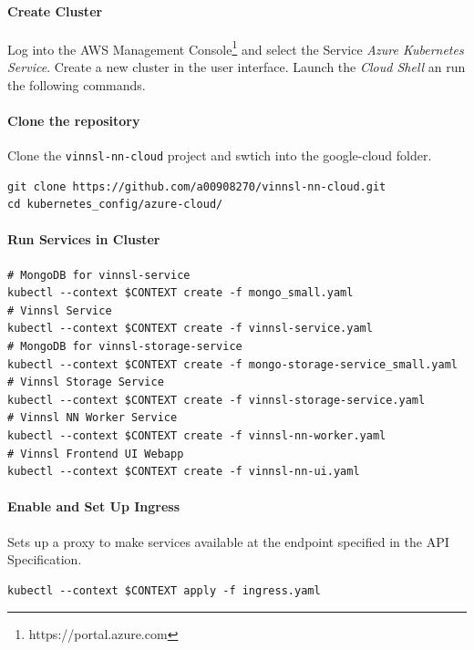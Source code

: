 \paragraph{Create Cluster}\label{create-cluster-2}

Log into the AWS Management Console\footnote{https://portal.azure.com}
and select the Service \emph{Azure Kubernetes Service}. Create a new
cluster in the user interface. Launch the \emph{Cloud Shell} an run the
following commands.

\paragraph{Clone the repository}\label{clone-the-repository-2}

Clone the \texttt{vinnsl-nn-cloud} project and swtich into the
google-cloud folder.

\begin{verbatim}
git clone https://github.com/a00908270/vinnsl-nn-cloud.git
cd kubernetes_config/azure-cloud/
\end{verbatim}

\paragraph{Run Services in Cluster}\label{run-services-in-cluster-3}

\begin{verbatim}
# MongoDB for vinnsl-service
kubectl --context $CONTEXT create -f mongo_small.yaml 
# Vinnsl Service
kubectl --context $CONTEXT create -f vinnsl-service.yaml
# MongoDB for vinnsl-storage-service
kubectl --context $CONTEXT create -f mongo-storage-service_small.yaml
# Vinnsl Storage Service
kubectl --context $CONTEXT create -f vinnsl-storage-service.yaml
# Vinnsl NN Worker Service
kubectl --context $CONTEXT create -f vinnsl-nn-worker.yaml
# Vinnsl Frontend UI Webapp
kubectl --context $CONTEXT create -f vinnsl-nn-ui.yaml

\end{verbatim}

\paragraph{Enable and Set Up Ingress}\label{enable-and-set-up-ingress-3}

Sets up a proxy to make services available at the endpoint specified in
the API Specification.

\begin{verbatim}
kubectl --context $CONTEXT apply -f ingress.yaml
\end{verbatim}

